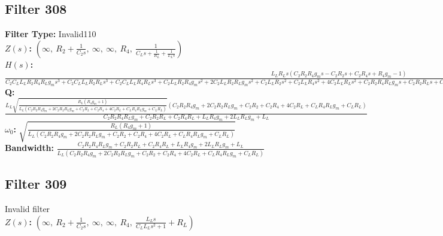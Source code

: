 \documentclass{article}
\begin{document}
\subsection*{Filter 308}
\textbf{Filter Type:} Invalid110 \\ 
\textbf{$Z(s)$:} $\left( \infty, \  R_{2} + \frac{1}{C_{2} s}, \  \infty, \  \infty, \  R_{4}, \  \frac{1}{C_{L} s + \frac{1}{R_{L}} + \frac{1}{L_{L} s}}\right)$ \\ 
\textbf{$H(s)$:} $\frac{L_{L} R_{L} s \left(C_{2} R_{2} R_{4} g_{m} s - C_{2} R_{2} s + C_{2} R_{4} s + R_{4} g_{m} - 1\right)}{C_{2} C_{L} L_{L} R_{2} R_{4} R_{L} g_{m} s^{3} + C_{2} C_{L} L_{L} R_{2} R_{L} s^{3} + C_{2} C_{L} L_{L} R_{4} R_{L} s^{3} + C_{2} L_{L} R_{2} R_{4} g_{m} s^{2} + 2 C_{2} L_{L} R_{2} R_{L} g_{m} s^{2} + C_{2} L_{L} R_{2} s^{2} + C_{2} L_{L} R_{4} s^{2} + 4 C_{2} L_{L} R_{L} s^{2} + C_{2} R_{2} R_{4} R_{L} g_{m} s + C_{2} R_{2} R_{L} s + C_{2} R_{4} R_{L} s + C_{L} L_{L} R_{4} R_{L} g_{m} s^{2} + C_{L} L_{L} R_{L} s^{2} + L_{L} R_{4} g_{m} s + 2 L_{L} R_{L} g_{m} s + L_{L} s + R_{4} R_{L} g_{m} + R_{L}}$ \\ 
\textbf{Q:} $\frac{L_{L} \sqrt{\frac{R_{L} \left(R_{4} g_{m} + 1\right)}{L_{L} \left(C_{2} R_{2} R_{4} g_{m} + 2 C_{2} R_{2} R_{L} g_{m} + C_{2} R_{2} + C_{2} R_{4} + 4 C_{2} R_{L} + C_{L} R_{4} R_{L} g_{m} + C_{L} R_{L}\right)}} \left(C_{2} R_{2} R_{4} g_{m} + 2 C_{2} R_{2} R_{L} g_{m} + C_{2} R_{2} + C_{2} R_{4} + 4 C_{2} R_{L} + C_{L} R_{4} R_{L} g_{m} + C_{L} R_{L}\right)}{C_{2} R_{2} R_{4} R_{L} g_{m} + C_{2} R_{2} R_{L} + C_{2} R_{4} R_{L} + L_{L} R_{4} g_{m} + 2 L_{L} R_{L} g_{m} + L_{L}}$ \\ 
\textbf{$\omega_0$:} $\sqrt{\frac{R_{L} \left(R_{4} g_{m} + 1\right)}{L_{L} \left(C_{2} R_{2} R_{4} g_{m} + 2 C_{2} R_{2} R_{L} g_{m} + C_{2} R_{2} + C_{2} R_{4} + 4 C_{2} R_{L} + C_{L} R_{4} R_{L} g_{m} + C_{L} R_{L}\right)}}$ \\ 
\textbf{Bandwidth:} $\frac{C_{2} R_{2} R_{4} R_{L} g_{m} + C_{2} R_{2} R_{L} + C_{2} R_{4} R_{L} + L_{L} R_{4} g_{m} + 2 L_{L} R_{L} g_{m} + L_{L}}{L_{L} \left(C_{2} R_{2} R_{4} g_{m} + 2 C_{2} R_{2} R_{L} g_{m} + C_{2} R_{2} + C_{2} R_{4} + 4 C_{2} R_{L} + C_{L} R_{4} R_{L} g_{m} + C_{L} R_{L}\right)}$ \\ 
\subsection*{Filter 309}
Invalid filter \\ 
\textbf{$Z(s)$:} $\left( \infty, \  R_{2} + \frac{1}{C_{2} s}, \  \infty, \  \infty, \  R_{4}, \  \frac{L_{L} s}{C_{L} L_{L} s^{2} + 1} + R_{L}\right)$ \\ 
\end{document}
